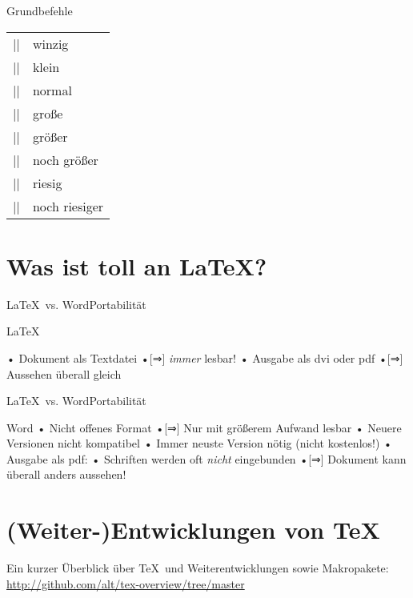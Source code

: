 \begin{frame}[c,fragile]{Grundbefehle}
\begin{block}{}
\begin{tabular}{ll}
|\tiny| & \tiny winzig \\
|\small| & \small klein \\
|\normalsize| & \normalsize normal\\
|\large| & \large große\\
|\Large| & \Large größer\\
|\LARGE| & \LARGE noch größer\\
|\huge| & \huge riesig\\
|\Huge| & \Huge noch riesiger\\
\end{tabular}
\end{block}
\end{frame}


\section[Warum LaTeX?]{Was ist toll an \LaTeX?}
\begin{frame}{\LaTeX\ vs. Word}{Portabilität}
\begin{block}{\strut\LaTeX}
• Dokument als Textdatei
•[⇒] \emph{immer} lesbar!
• Ausgabe als dvi oder pdf
•[⇒] Aussehen überall gleich
\•
\end{block}
\end{frame}

\begin{frame}{\LaTeX\ vs. Word}{Portabilität}
\begin{block}{Word}
• Nicht offenes Format
•[⇒] Nur mit größerem Aufwand lesbar
• Neuere Versionen nicht kompatibel
• Immer neuste Version nötig (nicht kostenlos!)
• Ausgabe als pdf:
• Schriften werden oft \emph{nicht} eingebunden
•[⇒] Dokument kann überall anders aussehen!
\• 
\end{block}
\end{frame}

\section{(Weiter-)Entwicklungen von \TeX}
\begin{frame}{}
Ein kurzer Überblick über \TeX\ und Weiterentwicklungen sowie Makropakete:
\\\small \url{http://github.com/alt/tex-overview/tree/master}
\end{frame}

